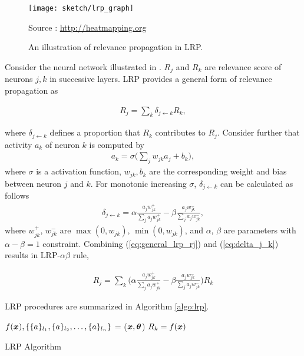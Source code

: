  \begin{figure}[!hbt]
	\begin{center}
		\texttt{[image: sketch/lrp\_graph]}
		\caption{An illustration of relevance propagation in LRP.}
		\small{
			Source : \url{http://heatmapping.org}
			}
		\label{fig:lrp_graph}
	\end{center}
\end{figure}

Consider the neural network illustrated in \addfigure{\ref{fig:lrp_graph}}. $R_j$ and $R_k$ are relevance score of  neurons $j,k$ in successive layers.  LRP provides a general form of relevance propagation as 

\begin{align} \label{eq:general_lrp_rj}
	R_j = \sum_{k} 	\delta_{j\leftarrow k} R_{k} ,
\end{align}

where $\delta_{j\leftarrow k}$ defines a proportion that  $R_{k}$ contributes to $R_j$. Consider further that activity $a_k$ of neuron $k$ is computed by 
\begin{align}
	a_k = \sigma \bigg( \sum_{j} w_{jk} a_j + b_k \bigg),
\end{align} 
where $\sigma$ is a activation function, $w_{jk}, b_k$ are the corresponding weight and bias between neuron $j$ and $k$. For monotonic increasing $\sigma$, $\delta_{j\leftarrow k}$ can be calculated as follows 
\begin{align} \label{eq:delta_j_k}
	\delta_{j\leftarrow k} = \alpha\frac{a_j w_{jk}^+}{\sum_{j} a_jw_{jk}^+} - \beta\frac{a_j w_{jk}^-}{\sum_{j} a_jw_{jk}^-},
\end{align}
where $w_{jk}^+$, $w_{jk}^-$ are $\max(0, w_{jk})$, $\min(0, w_{jk})$, and $\alpha$,  $\beta$ are parameters with $\alpha-\beta = 1$ constraint. Combining (\ref{eq:general_lrp_rj}) and (\ref{eq:delta_j_k}) results in LRP-$\alpha\beta$ rule, 

\begin{align}
	R_j = \sum_{k} 	\bigg( \alpha\frac{a_j w_{jk}^+}{\sum_{j} a_jw_{jk}^+} - \beta\frac{a_j w_{jk}^-}{\sum_{j} a_jw_{jk}^-} \bigg )  R_{k}
\end{align}

LRP procedures are summarized in Algorithm \ref{algo:lrp}.

\begin{algorithm}[H]
$f(\patvector{x}), \{ \{a\}_{l_1}, \{a\}_{l_2}, \dots, \{a\}_{l_n}\}$ = ($\patvector{x}, \patvector{\theta}$)\;
$R_k = f(\patvector{x})$\;
 \caption{LRP Algorithm}
 \label{algo:lrp}
\end{algorithm}


